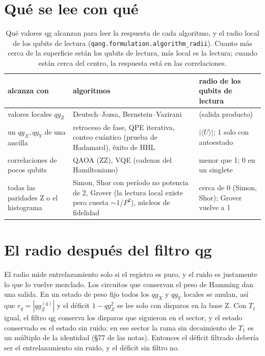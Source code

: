 \documentclass[11pt]{article}
\newcommand{\qZ}{qg_Z}
\newcommand{\qX}{qg_X}
\newcommand{\qY}{qg_Y}
\begin{document}
\section{Qué se lee con qué}

\begin{table}[h]
\centering\small
\caption{Qué valores qg alcanzan para leer la respuesta de cada algoritmo, y el radio local de los qubits de
lectura (\texttt{qang.formulation.algorithm\_radii}). Cuanto más cerca de la superficie están los qubits de lectura,
más local es la lectura; cuando están cerca del centro, la respuesta está en las correlaciones.}
\label{tab:lectura}\medskip
\begin{tabular}{>{\raggedright\arraybackslash}p{3.6cm}>{\raggedright\arraybackslash}p{7.2cm}>{\raggedright\arraybackslash}p{3.6cm}}
\toprule
alcanza con & algoritmos & radio de los qubits de lectura \\
\midrule
valores locales $\qZ$ & Deutsch--Jozsa, Bernstein--Vazirani & 1 (salida producto) \\
un $\qX,\qY$ de una ancilla & retroceso de fase, QPE iterativa, conteo cuántico (prueba de Hadamard), éxito de HHL & $|\langle U\rangle|$; 1 solo con autoestado \\
correlaciones de pocos qubits & QAOA (ZZ), VQE (cadenas del Hamiltoniano) & menor que 1; 0 en un singlete \\
todas las paridades Z o el histograma & Simon, Shor con período no potencia de 2, Grover (la lectura local existe pero cuesta $\sim1/P^2$), núcleos de fidelidad & cerca de 0 (Simon, Shor); Grover vuelve a 1 \\
\bottomrule
\end{tabular}
\end{table}

\section{El radio después del filtro qg}

El radio mide entrelazamiento solo si el registro es puro, y el ruido es justamente lo que lo vuelve mezclado. Los
circuitos que conservan el peso de Hamming dan una salida. En un estado de peso fijo todos los $\qX$ y $\qY$
locales se anulan, así que $r_q=|\qZ^{(q)}|$ y el déficit $1-\qZ^2$ se lee solo con disparos en la base Z. Con $T_1$
igual, el filtro qg conserva los disparos que siguieron en el sector, y el estado conservado es el estado sin ruido:
en ese sector la rama sin decaimiento de $T_1$ es un múltiplo de la identidad (§77 de las notas). Entonces el
déficit filtrado debería ser el entrelazamiento sin ruido, y el déficit sin filtro no.
\end{document}
